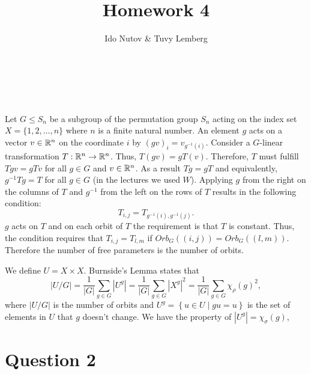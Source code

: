 \documentclass[english]{article}
\begin{document}

\title{Homework 4}
\author{Ido Nutov \& Tuvy Lemberg}
\maketitle

\section{~}



Let $G\leq S_n$ be a subgroup of the permutation group $S_n$
acting on the index set $X=\ensuremath{\{1,2,\ldots,n\}}$
where $n$ is a finite natural number. An element $g$ acts on a vector
$v\in\mathbb{R}^{n}$ on the coordinate $i$ by $\left(gv\right)_{i}=v_{g^{-1}(i)}$.
Consider a $G$-linear transformation $T:\mathbb{R}^{n}\rightarrow\mathbb{R}^{n}$.
Thus, $T(gv)=gT(v)$. Therefore, $T$ must fulfill $Tgv=gTv$ for all
$g\in G$ and $v\in\mathbb{R}^{n}$. As a result $Tg=gT$ and equivalently,
$g^{-1}Tg=T$ for all $g\in G$ (in the lectures we used $W$). Applying
$g$ from the right on the columns of $T$ and $g^{-1}$ from the
left on the rows of $T$ results in the following condition: 
\begin{equation}
T_{i,j}=T_{g^{-1}(i),g^{-1}(j)}.\label{eq:q1_condition}
\end{equation}
$g$ acts on $T$ and on each orbit of $T$ the requirement is
that $T$ is constant. Thus, the condition requires that $T_{i,j}=T_{l,m}$
if $Orb_{G}\left((i,j)\right)=Orb_{G}\left((l,m)\right)$. Therefore
the number of free parameters is the number of orbits. 

We define $U=X\times X$. Burnside\textquoteright s Lemma states that
\begin{equation}
\left|U\slash G\right|
=
\frac{1}{\left|G\right|}\sum_{g\in G}\left|U^{g}\right|
=
\frac{1}{\left|G\right|}\sum_{g\in G}\left|X^{g}\right|^{2}
=
\frac{1}{\left|G\right|}\sum_{g\in G}\chi_{\rho}(g)^{2}
,
\label{eq:burnside}
\end{equation}
 where $\left|U\slash G\right|$ is the number of orbits and $U^{g}=\left\{ u\in U\mid gu=u\right\} $
is the set of elements in $U$ that $g$ doesn't change. We have the
property of $\left|U^{g}\right|=\chi_{\sigma}(g)$,

\section{Question 2}

\subsection{~}
\end{document}
